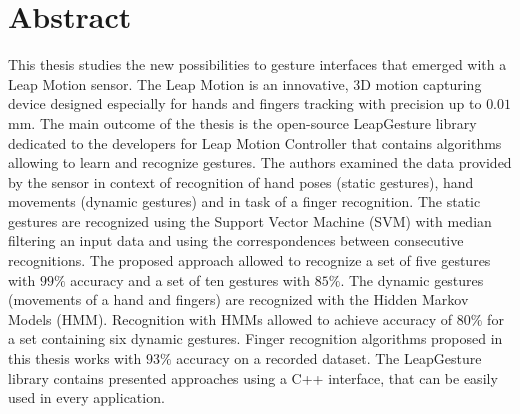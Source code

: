 \chapter{Abstract}
This thesis studies the new possibilities to gesture interfaces that emerged with a Leap Motion sensor.
The Leap Motion is an innovative, 3D motion capturing device designed especially for hands and fingers tracking with precision up to $0.01$mm.
The main outcome of the thesis is the open-source LeapGesture library dedicated to the developers for Leap Motion Controller that contains algorithms allowing to learn and recognize gestures.
The authors examined the data provided by the sensor in context of recognition of hand poses (static gestures), hand movements (dynamic gestures) and in task of a finger recognition.
The static gestures are recognized using the Support Vector Machine (SVM) with median filtering an input data and using the correspondences between consecutive recognitions.
The proposed approach allowed to recognize a set of five gestures with $99\%$ accuracy and a set of ten gestures with $85\%$.
The dynamic gestures (movements of a hand and fingers) are recognized with the Hidden Markov Models (HMM). 
Recognition with HMMs allowed to achieve accuracy of $80\%$ for a set containing six dynamic gestures.
Finger recognition algorithms proposed in this thesis works with $93\%$ accuracy on a recorded dataset.
The LeapGesture library contains presented approaches using a C++ interface, that can be easily used in every application.